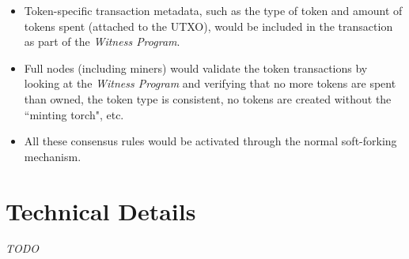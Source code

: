 \documentclass{article}
\begin{document}
\begin{itemize}
    \item Token-specific transaction metadata, such as the type of token and amount of tokens spent (attached to the UTXO), would be included in the transaction as part of the \emph{Witness Program}.
    \item Full nodes (including miners) would validate the token transactions by looking at the \emph{Witness Program} and verifying that no more tokens are spent than owned, the token type is consistent, no tokens are created without the ``minting torch", etc.
    \item All these consensus rules would be activated through the normal soft-forking mechanism.
\end{itemize}

\newpage
\section{Technical Details}

\emph{TODO}
\end{document}
